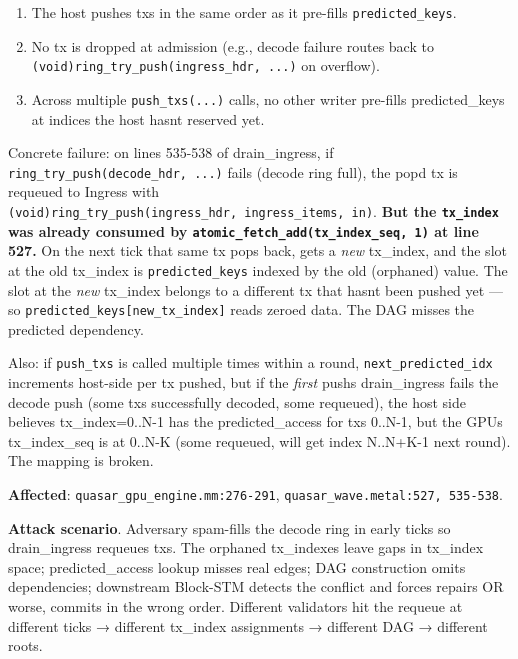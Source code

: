 \documentclass[
]{article}
\providecommand{\tightlist}{%
  \setlength{\itemsep}{0pt}\setlength{\parskip}{0pt}}
\begin{document}
\begin{enumerate}
\def\labelenumi{\arabic{enumi}.}
\tightlist
\item
  The host pushes txs in the same order as it pre-fills
  \texttt{predicted\_keys}.
\item
  No tx is dropped at admission (e.g., decode failure routes back to
  \texttt{(void)ring\_try\_push(ingress\_hdr,\ ...)} on overflow).
\item
  Across multiple \texttt{push\_txs(...)} calls, no other writer
  pre-fills predicted\_keys at indices the host hasn\textquotesingle t
  reserved yet.
\end{enumerate}

Concrete failure: on lines 535-538 of drain\_ingress, if
\texttt{ring\_try\_push(decode\_hdr,\ ...)} fails (decode ring full),
the pop\textquotesingle d tx is requeued to Ingress with
\texttt{(void)ring\_try\_push(ingress\_hdr,\ ingress\_items,\ in)}.
\textbf{But the \texttt{tx\_index} was already consumed by
\texttt{atomic\_fetch\_add(tx\_index\_seq,\ 1)} at line 527.} On the
next tick that same tx pops back, gets a \emph{new} tx\_index, and the
slot at the old tx\_index is \texttt{predicted\_keys} indexed by the old
(orphaned) value. The slot at the \emph{new} tx\_index belongs to a
different tx that hasn\textquotesingle t been pushed yet --- so
\texttt{predicted\_keys{[}new\_tx\_index{]}} reads zeroed data. The DAG
misses the predicted dependency.

Also: if \texttt{push\_txs} is called multiple times within a round,
\texttt{next\_predicted\_idx} increments host-side per tx pushed, but if
the \emph{first} push\textquotesingle s drain\_ingress fails the decode
push (some txs successfully decoded, some requeued), the host side
believes tx\_index=0..N-1 has the predicted\_access for txs 0..N-1, but
the GPU\textquotesingle s tx\_index\_seq is at 0..N-K (some requeued,
will get index N..N+K-1 next round). The mapping is broken.

\textbf{Affected}: \texttt{quasar\_gpu\_engine.mm:276-291},
\texttt{quasar\_wave.metal:527,\ 535-538}.

\textbf{Attack scenario}. Adversary spam-fills the decode ring in early
ticks so drain\_ingress requeues txs. The orphaned tx\_indexes leave
gaps in tx\_index space; predicted\_access lookup misses real edges; DAG
construction omits dependencies; downstream Block-STM detects the
conflict and forces repairs OR worse, commits in the wrong order.
Different validators hit the requeue at different ticks → different
tx\_index assignments → different DAG → different roots.
\end{document}
